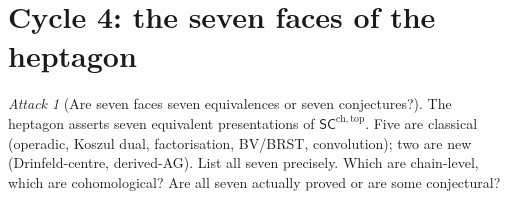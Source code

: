 \documentclass{article}
\theoremstyle{definition}
\theoremstyle{remark}
\newtheorem{attack}[theorem]{Attack}
\newcommand{\SCchtop}{\mathsf{SC}^{\mathrm{ch,top}}}
\begin{document}
\section{Cycle 4: the seven faces of the heptagon}
\label{sec:cycle-4}

\begin{attack}[Are seven faces seven equivalences or seven
conjectures?]
The heptagon asserts seven equivalent presentations of $\SCchtop$.
Five are classical (operadic, Koszul dual, factorisation,
BV/BRST, convolution); two are new (Drinfeld-centre,
derived-AG). List all seven precisely. Which are chain-level, which
are cohomological? Are all seven actually proved or are some
conjectural?
\end{attack}
\end{document}
